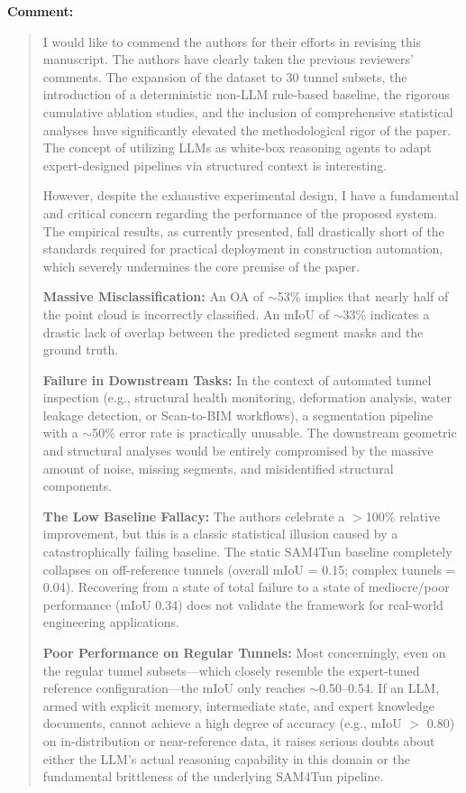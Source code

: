 \documentclass[11pt,a4paper]{article}
\newenvironment{commentblock}{%
  \par\smallskip\noindent\textbf{Comment:}\par
  \begin{quote}\itshape\color{black}
}{%
  \end{quote}\smallskip
}
\begin{document}
\begin{commentblock}
I would like to commend the authors for their efforts in revising this manuscript. The authors have clearly taken the previous reviewers' comments. The expansion of the dataset to 30 tunnel subsets, the introduction of a deterministic non-LLM rule-based baseline, the rigorous cumulative ablation studies, and the inclusion of comprehensive statistical analyses have significantly elevated the methodological rigor of the paper. The concept of utilizing LLMs as white-box reasoning agents to adapt expert-designed pipelines via structured context is interesting.

However, despite the exhaustive experimental design, I have a fundamental and critical concern regarding the performance of the proposed system. The empirical results, as currently presented, fall drastically short of the standards required for practical deployment in construction automation, which severely undermines the core premise of the paper.

\textbf{Massive Misclassification:} An OA of $\sim$53\% implies that nearly half of the point cloud is incorrectly classified. An mIoU of $\sim$33\% indicates a drastic lack of overlap between the predicted segment masks and the ground truth.

\textbf{Failure in Downstream Tasks:} In the context of automated tunnel inspection (e.g., structural health monitoring, deformation analysis, water leakage detection, or Scan-to-BIM workflows), a segmentation pipeline with a $\sim$50\% error rate is practically unusable. The downstream geometric and structural analyses would be entirely compromised by the massive amount of noise, missing segments, and misidentified structural components.

\textbf{The Low Baseline Fallacy:} The authors celebrate a $>$100\% relative improvement, but this is a classic statistical illusion caused by a catastrophically failing baseline. The static SAM4Tun baseline completely collapses on off-reference tunnels (overall mIoU = 0.15; complex tunnels = 0.04). Recovering from a state of total failure to a state of mediocre/poor performance (mIoU 0.34) does not validate the framework for real-world engineering applications.

\textbf{Poor Performance on Regular Tunnels:} Most concerningly, even on the regular tunnel subsets---which closely resemble the expert-tuned reference configuration---the mIoU only reaches $\sim$0.50--0.54. If an LLM, armed with explicit memory, intermediate state, and expert knowledge documents, cannot achieve a high degree of accuracy (e.g., mIoU $>$ 0.80) on in-distribution or near-reference data, it raises serious doubts about either the LLM's actual reasoning capability in this domain or the fundamental brittleness of the underlying SAM4Tun pipeline.

\end{commentblock}
\end{document}
